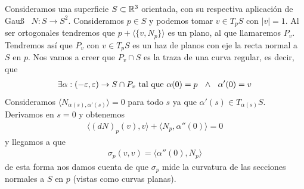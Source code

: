 Consideramos una superficie $S\subset \mathbb{R}^3$ orientada, con su respectiva aplicación de Gau\ss~ $N:S\to S^2$. Consideramos $p\in S$ y podemos tomar $v\in T_pS$ con $|v|=1$. Al ser ortogonales tendremos que $p + \langle \{v, N_p \}\rangle$ es un plano, al que llamaremos $P_v$. Tendremos así que $P_v$ con $v\in T_pS$ es un haz de planos con eje la recta normal a $S$ en $p$. Nos vamos a creer que $P_v\cap S$ es la traza de una curva regular, es decir, que
\begin{gather*}
    \exists \alpha:(-\varepsilon, \varepsilon) \to S\cap P_v \text{ tal que } \alpha(0)=p\ \ \wedge \ \ \alpha'(0)=v
\end{gather*}
Consideramos $\langle N_{\alpha(s), \alpha'(s)} \rangle = 0$ para todo $s$ ya que $\alpha'(s)\in T_{\alpha(s)}S$. Derivamos en $s=0$ y obtenemos
\begin{gather*}
    \langle (dN)_p(v), v\rangle + \langle N_p, \alpha''(0) \rangle = 0
\end{gather*}
y llegamos a que 
\begin{gather*}
    \sigma_p(v,v) = \langle \alpha''(0),N_p \rangle
\end{gather*}
de esta forma nos damos cuenta de que $\sigma_p$ mide la curvatura de las secciones normales a $S$ en $p$ (vistas como curvas planas).


